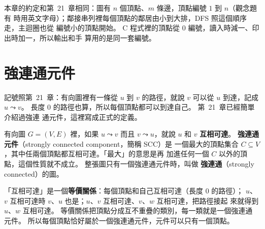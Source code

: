 本章的約定和第~21~章相同：圖有 $n$ 個頂點、$m$ 條邊，頂點編號 $1$ 到 $n$（觀念題有
時用英文字母）；鄰接串列裡每個頂點的鄰居由小到大排，DFS 照這個順序走，主迴圈也從
編號小的頂點開始。 C 程式裡的頂點從 $0$ 編號，讀入時減一、印出時加一，所以輸出和手
算用的是同一套編號。

\section{強連通元件}
\label{sec:con-scc}

記號照第~21~章：有向圖裡有一條從 $u$ 到 $v$ 的路徑，就說 $v$ 可以從 $u$ 到達，記成
$u \leadsto v$。 長度 $0$ 的路徑也算，所以每個頂點都可以到達自己。 第~21~章已經簡單介紹過強連
通元件，這裡寫成正式的定義。

\begin{definition}
有向圖 $G = (V, E)$ 裡，如果 $u \leadsto v$ 而且 $v \leadsto u$，就說 $u$ 和 $v$
\textbf{互相可達}。 \textbf{強連通元件}（strongly connected component，簡稱 SCC）是
一個最大的頂點集合 $C \subseteq V$，其中任兩個頂點都互相可達。「最大」的意思是再
加進任何一個 $C$ 以外的頂點，這個性質就不成立。 整張圖只有一個強連通元件時，叫做
\textbf{強連通}（strongly connected）的圖。
\end{definition}

「互相可達」是一個\textbf{等價關係}：每個頂點和自己互相可達（長度 $0$ 的路徑）；
$u$、$v$ 互相可達時 $v$、$u$ 也是；$u$、$v$ 互相可達、$v$、$w$ 互相可達，把路徑接起
來就得到 $u$、$w$ 互相可達。 等價關係把頂點分成互不重疊的類別，每一類就是一個強連通
元件。 所以每個頂點恰好屬於一個強連通元件，元件可以只有一個頂點。

